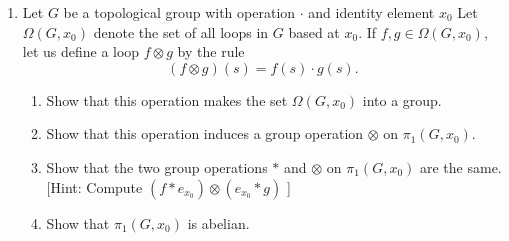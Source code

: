 \begin{enumerate}[itemsep=0.4em, parsep=0pt, topsep=0pt, partopsep=0pt, leftmargin=*, label=\arabic*., ref=\arabic*]
\par\nopagebreak
\begin{center}
	\label{fig:com_52_2}
\end{center}
\par\nopagebreak
\item Let \(G\) be a topological group with operation \(\cdot\) and identity element \(x_{0}\) Let \(\Omega ( {G,x_{0}})\) denote the set of all loops in \(G\) based at \(x_{0}\). If \(f,g \in \Omega ( {G,x_{0}})\), let us define a loop \(f \otimes g\) by the rule \[ ( {f \otimes g}) ( s) = f( s) \cdot g( s). \]
 \begin{enumerate}[itemsep=0.2em, parsep=0pt, topsep=0pt, partopsep=0pt, leftmargin=*, label=(\alph*), align=left]
 \item Show that this operation makes the set \(\Omega ( {G,x_{0}})\) into a group.
 \item Show that this operation induces a group operation \(\otimes\) on \({\pi }_{1}( {G,x_{0}})\).
 \item Show that the two group operations \(*\) and \(\otimes\) on \({\pi }_{1}( {G,x_{0}})\) are the same. [Hint: Compute \(( {f * e_{x_{0}}}) \otimes ( {e_{x_{0}} * g})\) ]
 \item Show that \({\pi }_{1}( {G,x_{0}})\) is abelian.
 \end{enumerate}
\end{enumerate}

